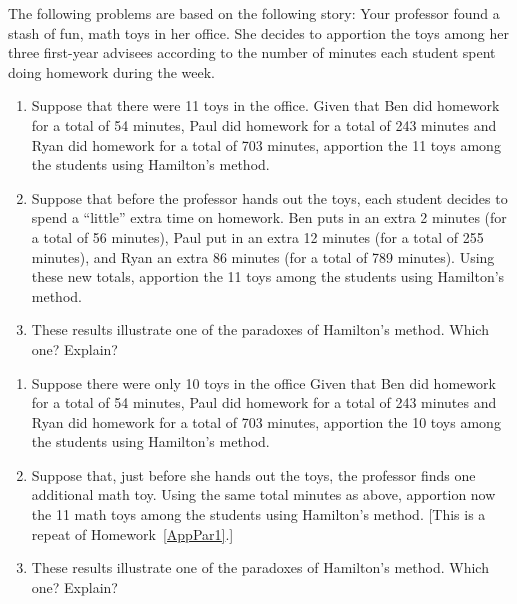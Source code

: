 \clearpage
\HOMEWORK
The following problems are based on the following story:  Your professor found a stash of fun, math toys in her office.  She decides to apportion the toys among her three first-year advisees according to the number of minutes each student spent doing homework during the week.
\begin{Denumerate}
\item \begin{enumerate}
	\item Suppose that there were 11 toys in the office.  Given that Ben did homework for a total of 54 minutes, Paul did homework for a total of 243 minutes and Ryan did homework for a total of 703 minutes, apportion the 11 toys among the students using Hamilton's method.
	\vfill \label{AppPar1}
	\item Suppose that before the professor hands out the toys, each student decides to spend a ``little'' extra time on homework.  Ben puts in an extra 2 minutes (for a total of 56 minutes), Paul put in an extra 12 minutes (for a total of 255 minutes), and Ryan an extra 86 minutes (for a total of 789 minutes).  Using these new totals, apportion the 11 toys among the students using Hamilton's method.
	\vfill
	\item These results illustrate one of the paradoxes of Hamilton's method.  Which one?  Explain? 
	\vfill
	\end{enumerate}
	
	\hwnewpage
\item \begin{enumerate}
	\item Suppose there were only 10 toys in the office Given that Ben did homework for a total of 54 minutes, Paul did homework for a total of 243 minutes and Ryan did homework for a total of 703 minutes, apportion the 10 toys among the students using Hamilton's method. 

	\vfill
	\item Suppose that, just before she hands out the toys, the professor finds one additional math toy.  Using the same total minutes as above, apportion now the 11 math toys among the students using Hamilton's method.  [This is a repeat of Homework~\ref{AppPar1}.] 
	\vfill
	\item These results illustrate one of the paradoxes of Hamilton's method.  Which one?  Explain? 
	\vfill
	\end{enumerate}
	

\end{Denumerate}
